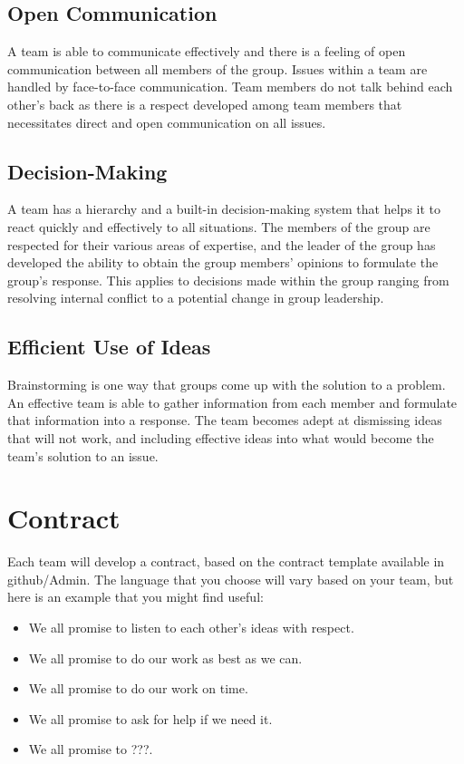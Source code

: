 \documentclass{article}\usepackage[]{graphicx}\usepackage[]{color}
\begin{document}
\subsection{Open Communication}
A team is able to communicate effectively and there is a feeling of open communication between all members of the group. Issues within a team are handled by face-to-face communication. Team members do not talk behind each other's back as there is a respect developed among team members that necessitates direct and open communication on all issues.

\subsection{Decision-Making}
A team has a hierarchy and a built-in decision-making system that helps it to react quickly and effectively to all situations. The members of the group are respected for their various areas of expertise, and the leader of the group has developed the ability to obtain the group members' opinions to formulate the group's response. This applies to decisions made within the group ranging from resolving internal conflict to a potential change in group leadership.

\subsection{Efficient Use of Ideas}

Brainstorming is one way that groups come up with the solution to a problem. An effective team is able to gather information from each member and formulate that information into a response. The team becomes adept at dismissing ideas that will not work, and including effective ideas into what would become the team's solution to an issue.

\section{Contract}

Each team will develop a contract, based on the contract template available in github/Admin. The language that you choose will vary based on your team, but here is an example that you might find useful:

\begin{itemize}
  \item We all promise to listen to each other's ideas with respect.
  \item We all promise to do our work as best as we can.
  \item We all promise to do our work on time.
  \item We all promise to ask for help if we need it.
  \item We all promise to ???.
\end{itemize}
\end{document}
